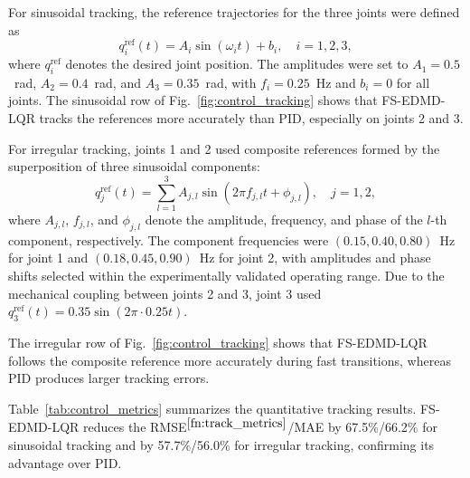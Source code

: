 \documentclass[final,3p,twocolumn,times]{elsarticle}
\begin{document}
For sinusoidal tracking, the reference trajectories for the three joints
were defined as
\begin{equation}
    q_i^{\text{ref}}(t) = A_i \sin(\omega_i t) + b_i, \quad i = 1, 2, 3,
\end{equation}
where $q_i^{\text{ref}}$ denotes the desired joint position. The amplitudes were set to $A_1=0.5$~rad, $A_2=0.4$~rad, and $A_3=0.35$~rad, with $f_i=0.25$~Hz and $b_i=0$ for all joints. The sinusoidal row of Fig.~\ref{fig:control_tracking} shows that FS-EDMD-LQR tracks the references more accurately than PID, especially on joints 2 and 3.

For irregular tracking, joints 1 and 2 used composite references formed by the superposition of three sinusoidal components:
\begin{equation}
q_j^{\text{ref}}(t) = \sum_{l=1}^{3} A_{j,l} \sin(2\pi f_{j,l} t + \phi_{j,l}),
\quad j = 1, 2,
\end{equation}
where $A_{j,l}$, $f_{j,l}$, and $\phi_{j,l}$ denote the amplitude, frequency, and phase of the $l$-th component, respectively. The component frequencies were $(0.15,0.40,0.80)$~Hz for joint 1 and $(0.18,0.45,0.90)$~Hz for joint 2, with amplitudes and phase shifts selected within the experimentally validated operating range. Due to the mechanical coupling between joints 2 and 3, joint 3 used $q_3^{\text{ref}}(t)=0.35\sin(2\pi\cdot0.25t)$.

The irregular row of Fig.~\ref{fig:control_tracking} shows that FS-EDMD-LQR follows the composite reference more accurately during fast transitions, whereas PID produces larger tracking errors.

Table~\ref{tab:control_metrics} summarizes the quantitative tracking results. FS-EDMD-LQR reduces the RMSE$^{\ref{fn:track_metrics}}$/MAE by 67.5\%/66.2\% for sinusoidal tracking and by 57.7\%/56.0\% for irregular tracking, confirming its advantage over PID.
\end{document}
